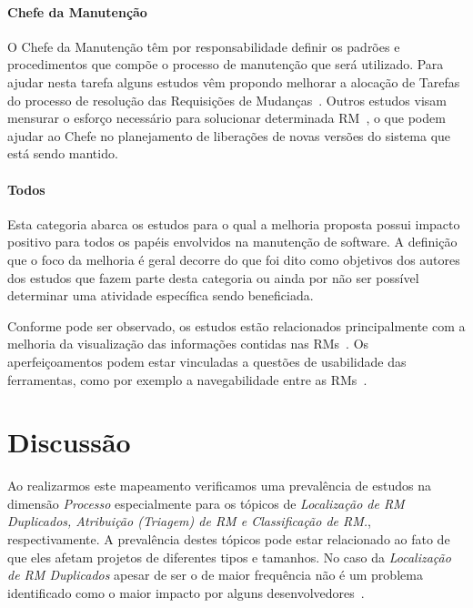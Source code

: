 \paragraph{Chefe da Manutenção} O Chefe da Manutenção têm por responsabilidade
definir os padrões e procedimentos que compõe o processo de manutenção que será
utilizado. Para ajudar nesta tarefa alguns estudos  vêm propondo melhorar a
alocação de Tarefas do processo de resolução das Requisições de
Mudanças~\cite{netto2010automated}. Outros estudos visam mensurar o esforço
necessário para solucionar determinada RM~\cite{Vijayakumar2014, Nagwani2010}, o
que podem ajudar ao Chefe no planejamento de liberações de novas versões do
sistema que está sendo mantido.

\paragraph{Todos} Esta categoria abarca os estudos para o qual a melhoria
proposta possui impacto positivo para todos os papéis envolvidos na manutenção
de software. A definição que o foco da melhoria é geral decorre do que foi dito
como objetivos dos autores dos estudos que fazem parte desta categoria ou ainda
por não ser possível determinar uma atividade específica sendo beneficiada.

Conforme pode ser observado, os estudos estão relacionados principalmente com a
melhoria da  visualização das informações contidas nas RMs~\cite{hora2012bug,
	takama2013application, dal2014bug}. Os aperfeiçoamentos podem estar
vinculadas a questões de usabilidade das ferramentas, como por exemplo a
navegabilidade entre as RMs~\cite{dal2014bug}.

\section{Discussão}
\label{sec:discussao}

Ao realizarmos este mapeamento verificamos uma prevalência de estudos na
dimensão \textit{Processo} especialmente para os tópicos de \textit{Localização
	de RM Duplicados, Atribuição (Triagem) de RM e Classificação de RM.},
respectivamente. A prevalência destes tópicos pode estar relacionado ao fato de
que eles afetam projetos de diferentes tipos e tamanhos. No caso da
\textit{Localização de RM Duplicados} apesar de ser o de maior frequência não é
um problema identificado como o maior impacto por alguns
desenvolvedores~\cite{Bettenburg2008a}.




